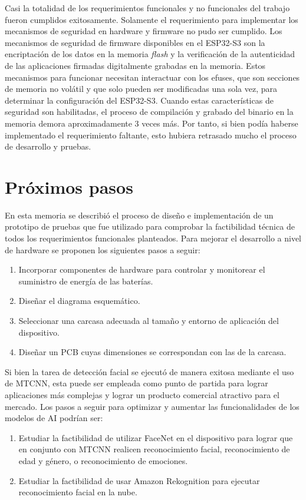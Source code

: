 Casi la totalidad de los requerimientos funcionales y no funcionales del trabajo fueron cumplidos exitosamente. Solamente el requerimiento para implementar los mecanismos de seguridad en hardware y firmware no pudo ser cumplido. Los mecanismos de seguridad de firmware disponibles en el ESP32-S3 son la encriptación de los datos en la memoria \textit{flash} y la verificación de la autenticidad de las aplicaciones firmadas digitalmente grabadas en la memoria. Estos mecanismos para funcionar necesitan interactuar con los efuses, que son secciones de memoria no volátil y que solo pueden ser modificadas una sola vez, para determinar la configuración del ESP32-S3. Cuando estas características de seguridad son habilitadas, el proceso de compilación y grabado del binario en la memoria demora aproximadamente 3 veces más. Por tanto, si bien podía haberse implementado el requerimiento faltante, esto hubiera retrasado mucho el proceso de desarrollo y pruebas.

\section{Próximos pasos}
En esta memoria se describió el proceso de diseño e implementación de un prototipo de pruebas que fue utilizado para comprobar la factibilidad técnica de todos los requerimientos funcionales planteados. Para mejorar el desarrollo a nivel de hardware se proponen los siguientes pasos a seguir:
\begin{enumerate}
	\item Incorporar componentes de hardware para controlar y monitorear el suministro de energía de las baterías.
	\item Diseñar el diagrama esquemático.
	\item Seleccionar una carcasa adecuada al tamaño y entorno de aplicación del dispositivo.
	\item Diseñar un PCB cuyas dimensiones se correspondan con las de la carcasa.
\end{enumerate}

Si bien la tarea de detección facial se ejecutó de manera exitosa mediante el uso de MTCNN, esta puede ser empleada como punto de partida para lograr aplicaciones más complejas y lograr un producto comercial atractivo para el mercado. Los pasos a seguir para optimizar y aumentar las funcionalidades de los modelos de AI podrían ser:
\begin{enumerate}
	\item Estudiar la factibilidad de utilizar FaceNet en el dispositivo para lograr que en conjunto con MTCNN realicen reconocimiento facial, reconocimiento de edad y género, o reconocimiento de emociones.
	\item Estudiar la factibilidad de usar Amazon Rekognition para ejecutar reconocimiento facial en la nube.
\end{enumerate}